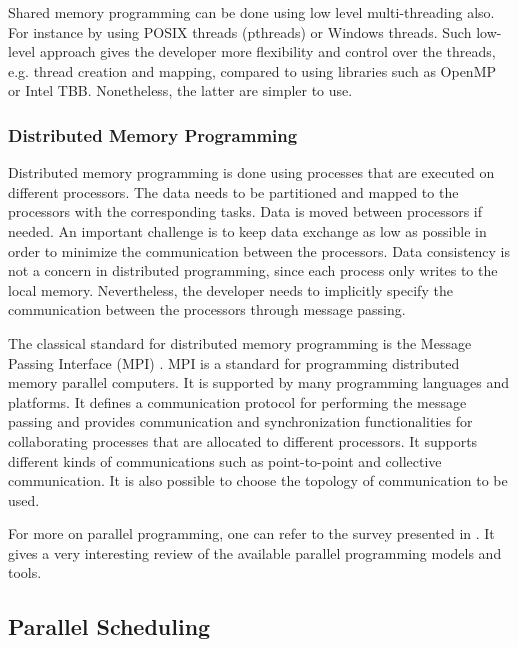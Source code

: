Shared memory programming can be done using low level multi-threading also. For instance by using POSIX threads (pthreads) or Windows threads. Such low-level approach gives the developer more flexibility and control over the threads, e.g. thread creation and mapping, compared to using libraries such as OpenMP or Intel TBB. Nonetheless, the latter are simpler to use. 

\subsubsection{Distributed Memory Programming}

Distributed memory programming is done using processes that are executed on different processors. The data needs to be partitioned and mapped to the processors with the corresponding tasks. Data is moved between processors if needed. An important challenge is to keep data exchange as low as possible in order to minimize the communication between the processors. Data consistency is not a concern in distributed programming, since each process only writes to the local memory. Nevertheless, the developer needs to implicitly specify the communication between the processors through message passing.  

The classical standard for distributed memory programming is the Message Passing Interface (MPI) \cite{mpi}. MPI is a standard for programming distributed memory parallel computers. It is supported by many programming languages and platforms. It defines a communication protocol for performing the message passing and provides communication and synchronization functionalities for collaborating processes that are allocated to different processors. It supports different kinds of communications such as point-to-point and collective communication. It is also possible to choose the topology of communication to be used.

For more on parallel programming, one can refer to the survey presented in \cite{diaz:2012}. It gives a very interesting review of the available parallel programming models and tools.

\subsection{Parallel Scheduling}

